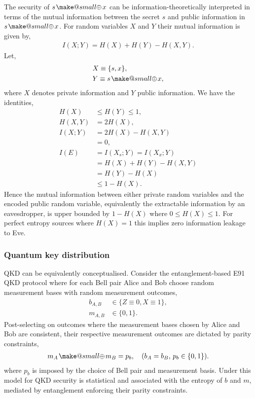 \documentclass[twocolumn, aps, amsmath, amssymb, nofootinbib, superscriptaddress, longbibliography, doublefloatfix, table-of-contents, eqsecnum, rmp]{revtex4-2}
\makeatletter
\newcommand{\soplus}{{{\hspace{1pt}}{\mathbin{\mathpalette\make@small{\mathbin\oplus}}}}{\hspace{1pt}}}
\newcommand{\make@small}[2]{%
  \vcenter{\hbox{%
    \scalebox{0.6}{$\m@th#1#2$}%
  }}%
}
\makeatother
\begin{document}
The security of $s\soplus x$ can be information-theoretically interpreted in terms of the mutual information between the secret $s$ and public information in $s\soplus x$. For random variables $X$ and $Y$ their mutual information is given by,
\begin{align}
	I(X;Y) = H(X) + H(Y) - H(X,Y).	
\end{align}
Let,
\begin{align}
 	&X\equiv \{s,x\},\nonumber\\
 	&Y\equiv s\soplus x,
\end{align} 
where $X$ denotes private information and $Y$ public information. We have the identities,
\begin{align}
 	H(X) &\leq H(Y) \leq 1,\nonumber\\
	H(X,Y) &= 2H(X),\nonumber\\
	I(X;Y) &= 2H(X)-H(X,Y)\nonumber\\
	&= 0,\nonumber\\
	I(E) &= I(X_s;Y) = I(X_x;Y)\nonumber\\
	&= H(X)+H(Y)-H(X,Y)\nonumber\\
	&= H(Y) - H(X)\nonumber\\
	&\leq 1-H(X).
\end{align}
Hence the mutual information between either private random variables and the encoded public random variable, equivalently the extractable information by an eavesdropper, is upper bounded by $1-H(X)$ where $0\leq H(X)\leq 1$. For perfect entropy sources where $H(X)=1$ this implies zero information leakage to Eve.

\subsubsection{Quantum key distribution}

QKD can be equivalently conceptualised. Consider the entanglement-based E91 QKD protocol where for each Bell pair Alice and Bob choose random measurement bases with random measurement outcomes,
\begin{align}
	b_{A,B} &\in \{Z\equiv 0, X\equiv 1\},\nonumber\\
	m_{A,B} &\in \{0,1\}.
\end{align}
Post-selecting on outcomes where the measurement bases chosen by Alice and Bob are consistent, their respective measurement outcomes are dictated by parity constraints,
\begin{align}
	m_A\soplus m_B = p_b,\quad (b_A=b_B,\, p_b\in\{0,1\}).
\end{align}
where $p_b$ is imposed by the choice of Bell pair and measurement basis. Under this model for QKD security is statistical and associated with the entropy of $b$ and $m$, mediated by entanglement enforcing their parity constraints.
\end{document}
